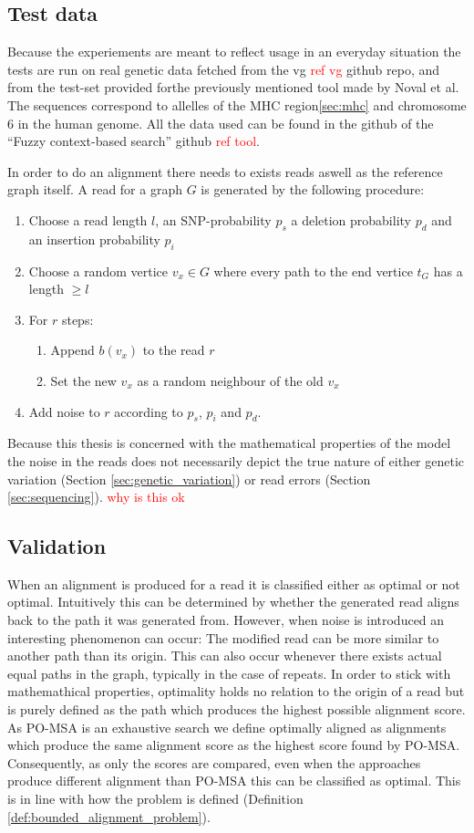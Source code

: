 \documentclass[thesis.tex]{subfiles}
\begin{document}
\subsection{Test data}
Because the experiements are meant to reflect usage in an everyday situation the tests are run on real genetic data fetched from the vg \textcolor{red}{ref vg} github repo, and from the test-set provided forthe previously mentioned tool made by Noval et al. The sequences correspond to allelles of the MHC region\ref{sec:mhc} and chromosome 6 in the human genome. All the data used can be found in the github of the ``Fuzzy context-based search'' github \textcolor{red}{ref tool}.\\
\par\noindent
In order to do an alignment there needs to exists reads aswell as the reference graph itself. A read for a graph $G$ is generated by the following procedure:
\begin{enumerate}
  \item Choose a read length $l$, an SNP-probability $p_s$ a deletion probability $p_d$ and an insertion probability $p_i$
  \item Choose a random vertice $v_x \in G$ where every path to the end vertice $t_G$ has a length $\geq l$
  \item For $r$ steps:
  \begin{enumerate}
    \item Append $b(v_x)$ to the read $r$
    \item Set the new $v_x$ as a random neighbour of the old $v_x$
  \end{enumerate}
  \item Add noise to $r$ according to $p_s$, $p_i$ and $p_d$.
\end{enumerate}
Because this thesis is concerned with the mathematical properties of the model the noise in the reads does not necessarily depict the true nature of either genetic variation (Section \ref{sec:genetic_variation}) or read errors (Section \ref{sec:sequencing}). \textcolor{red}{why is this ok}
\subsection{Validation}
When an alignment is produced for a read it is classified either as optimal or not optimal. Intuitively this can be determined by whether the generated read aligns back to the path it was generated from. However, when noise is introduced an interesting phenomenon can occur: The modified read can be more similar to another path than its origin. This can also occur whenever there exists actual equal paths in the graph, typically in the case of repeats. In order to stick with mathemathical properties, optimality holds no relation to the origin of a read but is purely defined as the path which produces the highest possible alignment score. As PO-MSA is an exhaustive search we define optimally aligned as alignments which produce the same alignment score as the highest score found by PO-MSA. Consequently, as only the scores are compared, even when the approaches produce different alignment than PO-MSA this can be classified as optimal. This is in line with how the problem is defined (Definition \ref{def:bounded_alignment_problem}).
\end{document}
